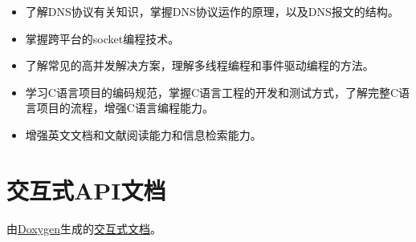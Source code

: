 \documentclass[lang=cn,11pt,a4paper,cite=authornum]{paper}
\begin{document}
\begin{itemize}
    \item 了解DNS协议有关知识，掌握DNS协议运作的原理，以及DNS报文的结构。
    \item 掌握跨平台的socket编程技术。
    \item 了解常见的高并发解决方案，理解多线程编程和事件驱动编程的方法。
    \item 学习C语言项目的编码规范，掌握C语言工程的开发和测试方式，了解完整C语言项目的流程，增强C语言编程能力。
    \item 增强英文文档和文献阅读能力和信息检索能力。
\end{itemize}

\appendix

\section{交互式API文档}

由\href{https://www.doxygen.org/index.html}{Doxygen}生成的\href{./APIdoc/index.html}{交互式文档}。
\end{document}
